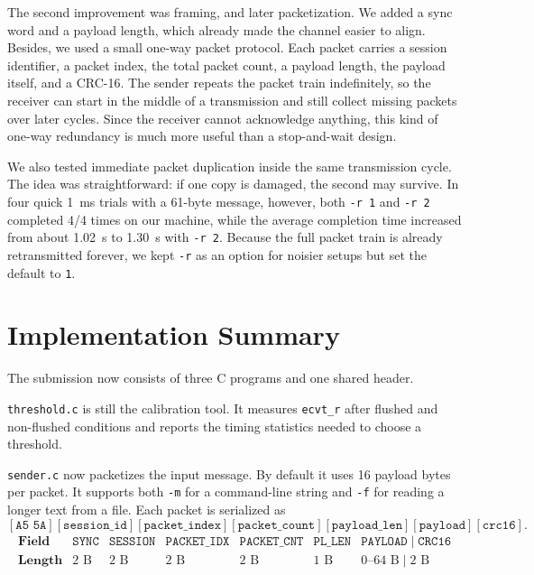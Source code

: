 \documentclass[11pt]{article}
\begin{document}
The second improvement was framing, and later packetization. We added a sync word and a payload length, which already made the channel easier to align.  Besides, we used a small one-way packet protocol. Each packet carries a session identifier, a packet index, the total packet count, a payload length, the payload itself, and a CRC-16. The sender repeats the packet train indefinitely, so the receiver can start in the middle of a transmission and still collect missing packets over later cycles. Since the receiver cannot acknowledge anything, this kind of one-way redundancy is much more useful than a stop-and-wait design.

We also tested immediate packet duplication inside the same transmission cycle. The idea was straightforward: if one copy is damaged, the second may survive. In four quick \SI{1}{ms} trials with a 61-byte message, however, both \texttt{-r 1} and \texttt{-r 2} completed 4/4 times on our machine, while the average completion time increased from about \SI{1.02}{s} to \SI{1.30}{s} with \texttt{-r 2}. Because the full packet train is already retransmitted forever, we kept \texttt{-r} as an option for noisier setups but set the default to \texttt{1}.

\section{Implementation Summary}
The submission now consists of three C programs and one shared header.

\texttt{threshold.c} is still the calibration tool. It measures \texttt{ecvt\_r} after flushed and non-flushed conditions and reports the timing statistics needed to choose a threshold.

\texttt{sender.c} now packetizes the input message. By default it uses 16 payload bytes per packet. It supports both \texttt{-m} for a command-line string and \texttt{-f} for reading a longer text from a file. Each packet is serialized as
\[
  [\texttt{A5 5A}][\texttt{session\_id}][\texttt{packet\_index}][\texttt{packet\_count}][\texttt{payload\_len}][\texttt{payload}][\texttt{crc16}].
\]
\[
\begin{array}{l|c|c|c|c|c|c|c}
\textbf{Field} & \texttt{SYNC} & \texttt{SESSION} & \texttt{PACKET\_IDX} & \texttt{PACKET\_CNT} & \texttt{PL\_LEN} & \texttt{PAYLOAD} \;|\; \texttt{CRC16} \\
\hline
\textbf{Length} & 2\text{ B} & 2\text{ B} & 2\text{ B} & 2\text{ B} & 1\text{ B} & 0\text{--}64\text{ B} \;|\; 2\text{ B}
\end{array}
\]
\end{document}

